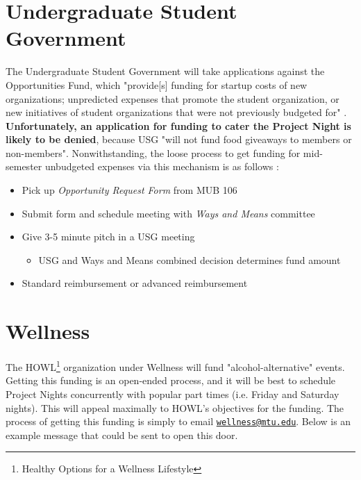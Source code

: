\documentclass[article]{memoir}
\newcommand{\bi}[0]{\begin{itemize}}
\newcommand{\ei}[0]{\end{itemize}}
\begin{document}
\section{Undergraduate Student Government}

The Undergraduate Student Government will take applications against the
Opportunities Fund, which "provide[s] funding for startup costs of new
organizations; unpredicted expenses that promote the student organization, or
new initiatives of student organizations that were not previously budgeted for"
\cite{mtuusg}. \textbf{Unfortunately, an application for funding to cater the
Project Night is likely to be denied}, because USG "will not fund food giveaways
to members or non-members"\cite{usgsite}. Nonwithstanding, the loose process to
get funding for mid-semester unbudgeted expenses via this mechanism is as
follows \cite{usgsite}:

\bi
\item Pick up \emph{Opportunity Request Form} from MUB 106
\item Submit form and schedule meeting with \emph{Ways and Means} committee
\item Give 3-5 minute pitch in a USG meeting
	\bi
	\item USG and Ways and Means combined decision determines fund amount
	\ei
\item Standard reimbursement or advanced reimbursement
\ei



\section{Wellness}

The HOWL\footnote{Healthy Options for a Wellness Lifestyle} organization under
Wellness will fund "alcohol-alternative" events.\cite{wellness} Getting this
funding is an open-ended process, and it will be best to schedule Project Nights
concurrently with popular part times (i.e. Friday and Saturday nights). This
will appeal maximally to HOWL's objectives for the funding. The process of
getting this funding is simply to email
\href{mailto:wellness@mtu.edu}{\texttt{wellness@mtu.edu}}. Below is an example
message that could be sent to open this door.
\end{document}

